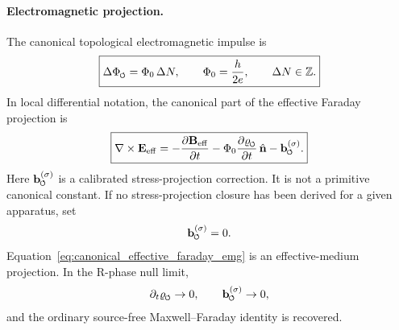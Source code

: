 \documentclass[11pt]{article}
\theoremstyle{definition}
\theoremstyle{plain}
\theoremstyle{remark}
\newcommand{\swirlarrow}{\mathchoice{\mkern-2mu\scriptstyle\boldsymbol{\circlearrowleft}}{\mkern-2mu\scriptstyle\boldsymbol{\circlearrowleft}}{\mkern-2mu\scriptscriptstyle\boldsymbol{\circlearrowleft}}{\mkern-2mu\scriptscriptstyle\boldsymbol{\circlearrowleft}}}
\begin{document}
        \paragraph{Electromagnetic projection.}
        The canonical topological electromagnetic impulse is
        \begin{align}
            \boxed{
            \Delta\Phi_{\swirlarrow}
            =
            \Phi_0\,\Delta N,
            \qquad
            \Phi_0=\frac{h}{2e},
            \qquad
            \Delta N\in\mathbb{Z}.
            }
            \label{eq:canonical_em_flux_impulse_closure}
        \end{align}
        In local differential notation, the canonical part of the effective Faraday projection is
        \begin{align}
            \boxed{
            \nabla\times\mathbf{E}_{\mathrm{eff}}
            =
            -\frac{\partial\mathbf{B}_{\mathrm{eff}}}{\partial t}
            -
            \Phi_0\frac{\partial\varrho_{\swirlarrow}}{\partial t}\,\hat{\mathbf n}
            -
            \mathbf{b}^{(\sigma)}_{\swirlarrow}.
            }
            \label{eq:canonical_effective_faraday_emg}
        \end{align}
        Here \(\mathbf{b}^{(\sigma)}_{\swirlarrow}\) is a calibrated stress-projection correction. It is not a primitive canonical constant. If no stress-projection closure has been derived for a given apparatus, set
        \begin{align}
            \mathbf{b}^{(\sigma)}_{\swirlarrow}=0.
            \label{eq:stress_projection_zero_default}
        \end{align}
        Equation~\eqref{eq:canonical_effective_faraday_emg} is an effective-medium projection. In the R-phase null limit,
        \begin{align}
            \partial_t\varrho_{\swirlarrow}\to0,
            \qquad
            \mathbf{b}^{(\sigma)}_{\swirlarrow}\to0,
        \end{align}
        and the ordinary source-free Maxwell--Faraday identity is recovered.
\end{document}
